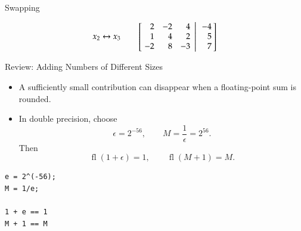 \documentclass[10pt]{beamer}
\begin{document}
\begin{frame}{Swapping}
\begin{itemize}
\begin{equation*}
\begin{aligned}
               x_2&\leftrightarrow x_3
           \end{aligned}\quad 
    \left[\left.\negthickspace\begin{array}{rrrr}  2 &  -2 & 4  \\
                                                    1 &  4 &  2  \\
                                                   -2 & 8 &  -3  \end{array}
           \right|\begin{array}{r} -4 \\  5 \\ 7  \end{array}\negthickspace\right]
\end{equation*}
\end{itemize}

    
\end{frame}



\begin{frame}[fragile]{Review: Adding Numbers of Different Sizes}

\begin{itemize}
    \item A sufficiently small contribution can disappear
    when a floating-point sum is rounded.

    \item In double precision, choose
    \[
        \epsilon=2^{-56},
        \qquad M=\frac{1}{\epsilon}=2^{56}.
    \]
    Then
    \[
        \operatorname{fl}(1+\epsilon)=1,
        \qquad
        \operatorname{fl}(M+1)=M.
    \]
\end{itemize}

\begin{lstlisting}
e = 2^(-56);
M = 1/e;

1 + e == 1
M + 1 == M
\end{lstlisting}


\end{frame}
\end{document}

